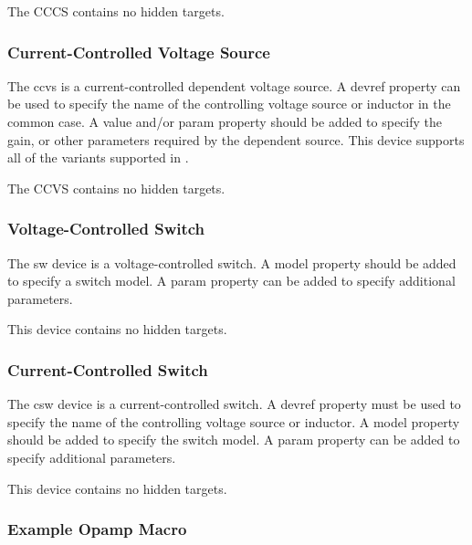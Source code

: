 The CCCS contains no hidden targets.

\subsubsection{Current-Controlled Voltage Source}

The {\et ccvs} is a current-controlled dependent voltage source.  A
{\et devref} property can be used to specify the name of the
controlling voltage source or inductor in the common case.  A {\et
value} and/or {\et param} property should be added to specify the
gain, or other parameters required by the dependent source.  This
device supports all of the variants supported in {\WRspice}.

The CCVS contains no hidden targets.

\subsubsection{Voltage-Controlled Switch}

The {\et sw} device is a voltage-controlled switch.  A {\et model}
property should be added to specify a switch model.  A {\et param}
property can be added to specify additional parameters.

This device contains no hidden targets.

\subsubsection{Current-Controlled Switch}

The {\et csw} device is a current-controlled switch.  A {\et devref}
property must be used to specify the name of the controlling voltage
source or inductor.  A {\et model} property should be added to specify
the switch model.  A {\et param} property can be added to specify
additional parameters.

This device contains no hidden targets.

\subsubsection{Example Opamp Macro}

